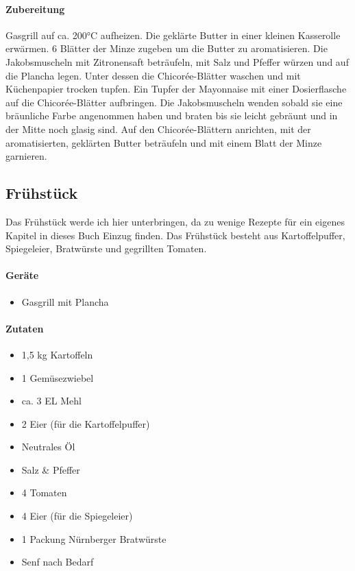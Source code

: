 \paragraph{Zubereitung}

Gasgrill auf ca. 200°C aufheizen. Die geklärte Butter in einer kleinen Kasserolle erwärmen. 6 Blätter der Minze zugeben um die Butter zu aromatisieren. Die Jakobsmuscheln mit Zitronensaft beträufeln, mit Salz und Pfeffer würzen und auf die Plancha legen. Unter dessen die Chicorée-Blätter waschen und mit  Küchenpapier trocken tupfen. Ein Tupfer der Mayonnaise mit einer Dosierflasche auf die Chicorée-Blätter aufbringen. Die Jakobsmuscheln wenden sobald sie eine bräunliche Farbe angenommen haben und braten bis sie leicht gebräunt und in der Mitte noch glasig sind. Auf den Chicorée-Blättern anrichten, mit der aromatisierten, geklärten Butter beträufeln und mit einem Blatt der Minze garnieren.
\newpage

\subsection{Frühstück}

Das Frühstück werde ich hier unterbringen, da zu wenige Rezepte für ein eigenes Kapitel in dieses Buch Einzug finden.
Das Frühstück besteht aus Kartoffelpuffer, Spiegeleier, Bratwürste und gegrillten Tomaten.

\paragraph{Geräte}

\begin{itemize}[noitemsep]
	\item Gasgrill mit Plancha
\end{itemize}

\paragraph{Zutaten}

\begin{itemize}[noitemsep]
	\item 1,5 kg Kartoffeln
	\item 1 Gemüsezwiebel
	\item ca. 3 EL Mehl
	\item 2 Eier (für die Kartoffelpuffer)
	\item Neutrales Öl
	\item Salz \& Pfeffer
	\item 4 Tomaten
	\item 4 Eier (für die Spiegeleier)
	\item 1 Packung Nürnberger Bratwürste
	\item Senf nach Bedarf
\end{itemize}

